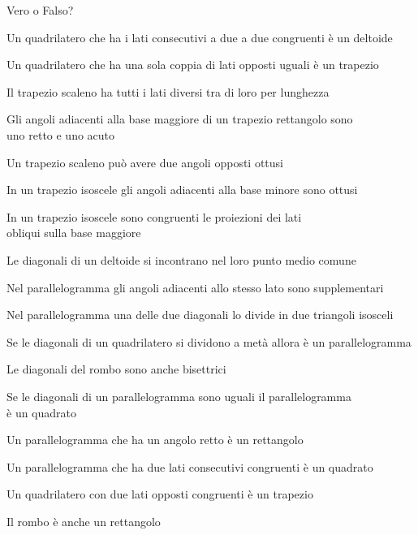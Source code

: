\begin{esercizio}
\label{ese:4.2}
Vero o Falso?
\begin{enumeratea}
\item Un quadrilatero che ha i lati consecutivi a due a due 
congruenti è un deltoide\hfill\boxV\quad\boxF
\item Un quadrilatero che ha una sola coppia di lati opposti uguali è 
un trapezio\hfill\boxV\quad\boxF
\item Il trapezio scaleno ha tutti i lati diversi tra di loro per 
lunghezza\hfill\boxV\quad\boxF
\item Gli angoli adiacenti alla base maggiore di un trapezio 
rettangolo sono \\
uno retto e uno acuto\hfill\boxV\quad\boxF
\item Un trapezio scaleno può avere due angoli opposti 
ottusi\hfill\boxV\quad\boxF
\item In un trapezio isoscele gli angoli adiacenti alla base minore 
sono ottusi\hfill\boxV\quad\boxF
\item In un trapezio isoscele sono congruenti le proiezioni dei lati \\ 
obliqui sulla base maggiore\hfill\boxV\quad\boxF
\item Le diagonali di un deltoide si incontrano nel loro punto medio 
comune\hfill\boxV\quad\boxF
\item Nel parallelogramma gli angoli adiacenti allo stesso lato sono 
supplementari\hfill\boxV\quad\boxF
\item Nel parallelogramma una delle due diagonali lo divide in due 
triangoli isosceli\hfill\boxV\quad\boxF
\item Se le diagonali di un quadrilatero si dividono a metà allora è 
un parallelogramma\hfill\boxV\quad\boxF
\item Le diagonali del rombo sono anche 
bisettrici\hfill\boxV\quad\boxF
\item Se le diagonali di un parallelogramma sono uguali il 
parallelogramma \\
è un quadrato\hfill\boxV\quad\boxF
\item Un parallelogramma che ha un angolo retto è un 
rettangolo\hfill\boxV\quad\boxF
\item Un parallelogramma che ha due lati consecutivi congruenti è un 
quadrato\hfill\boxV\quad\boxF
\item Un quadrilatero con due lati opposti congruenti è un 
trapezio\hfill\boxV\quad\boxF
\item Il rombo è anche un rettangolo\hfill\boxV\quad\boxF

\end{enumeratea}
\end{esercizio}

